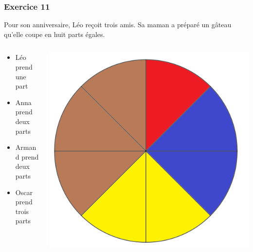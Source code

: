 \documentclass[xcolor={dvipsnames}]{beamer}
\begin{document}
\begin{frame}
	\frametitle{Exercice 11}
	
	Pour son anniversaire, Léo reçoit trois amis. Sa maman a préparé un gâteau qu'elle coupe en huit parts égales.
	
	
	\begin{columns}
		\begin{column}{0.5\textwidth}
			\begin{itemize}
				\item Léo prend une part
				\item Anna prend deux parts 
				\item Armand prend deux parts 
				\item Oscar prend trois parts
			\end{itemize}
		\end{column}
		\begin{column}{0.5\textwidth}
			\begin{center}
				\includegraphics[scale=0.08]{11_5}
			\end{center}
		\end{column}
	\end{columns}
	
\end{frame}
\end{document}
